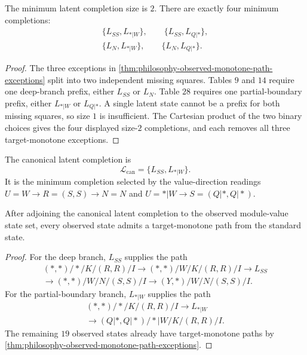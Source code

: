 \begin{theorem}
\label{thm:philosophy-two-state-latent-completion}
The minimum latent completion size is $2$. There are exactly four
minimum completions:
$$
\begin{gathered}
  \{L_{SS},L_{*|W}\},\qquad
  \{L_{SS},L_{Q|*}\},\\
  \{L_{N},L_{*|W}\},\qquad
  \{L_{N},L_{Q|*}\}.
\end{gathered}
$$
\end{theorem}
\begin{proof}
The three exceptions in
\autoref{thm:philosophy-observed-monotone-path-exceptions} split into
two independent missing squares. Tables $9$ and $14$ require one
deep-branch prefix, either $L_{SS}$ or $L_{N}$. Table $28$ requires one
partial-boundary prefix, either $L_{*|W}$ or $L_{Q|*}$. A single latent
state cannot be a prefix for both missing squares, so size $1$ is
insufficient. The Cartesian product of the two binary choices gives the
four displayed size-$2$ completions, and each removes all three
target-monotone exceptions.
\end{proof}


\begin{definition}
\label{def:philosophy-canonical-latent-completion}
The canonical latent completion is
$$
  \mathcal L_{\mathrm{can}}=\{L_{SS},L_{*|W}\}.
$$
It is the minimum completion selected by the value-direction readings
$U=W\to R=(S,S)\to N=N$ and $U=*|W\to S=(Q|*,Q|*)$.
\end{definition}


\begin{theorem}
\label{thm:philosophy-canonical-target-monotone-completion}
After adjoining the canonical latent completion to the observed
module-value state set, every observed state admits a target-monotone
path from the standard state.
\end{theorem}
\begin{proof}
For the deep branch, $L_{SS}$ supplies the path
$$
\begin{gathered}
  (*,*)/*/K/(R,R)/I
  \to
  (*,*)/W/K/(R,R)/I
  \to
  L_{SS}\\
  \to
  (*,*)/W/N/(S,S)/I
  \to
  (Y,*)/W/N/(S,S)/I.
\end{gathered}
$$
For the partial-boundary branch, $L_{*|W}$ supplies the path
$$
\begin{gathered}
  (*,*)/*/K/(R,R)/I
  \to
  L_{*|W}\\
  \to
  (Q|*,Q|*)/*|W/K/(R,R)/I.
\end{gathered}
$$
The remaining $19$ observed states already have target-monotone paths by
\autoref{thm:philosophy-observed-monotone-path-exceptions}.
\end{proof}

